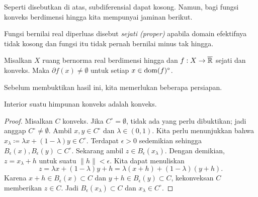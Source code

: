 Seperti disebutkan di atas, subdiferensial dapat kosong. Namun, bagi fungsi konveks berdimensi hingga kita mempunyai jaminan berikut.

Fungsi bernilai real diperluas disebut \emph{sejati (proper)} apabila domain efektifnya tidak kosong dan fungsi itu tidak pernah bernilai minus tak hingga.

\begin{theorem}\label{convexity:thm:nonempty_subgrad}
    Misalkan $X$ ruang bernorma real berdimensi hingga dan $f:X\rightarrow\overline{\mathbb{R}}$ sejati dan konveks. Maka $\partial f(x)\neq \emptyset$ untuk setiap $x\in \operatorname{\mathrm{dom}}(f)^\circ$.
\end{theorem}
Sebelum membuktikan hasil ini, kita memerlukan beberapa persiapan.

\begin{lemma}
    Interior suatu himpunan konveks adalah konveks.
\end{lemma}
\begin{proof}
    Misalkan $C$ konveks. Jika $C^\circ=\emptyset$, tidak ada yang perlu dibuktikan; jadi anggap $C^\circ\neq \emptyset$.
    Ambil $x,y\in C^\circ$ dan $\lambda\in (0,1)$. Kita perlu menunjukkan bahwa $x_\lambda\coloneqq\lambda x + (1-\lambda)y\in C^\circ$.
    Terdapat $\epsilon>0$ sedemikian sehingga $B_\epsilon(x),B_\epsilon(y)\subset C^\circ$. Sekarang ambil $z\in B_{\epsilon}(x_\lambda)$. Dengan demikian, $z=x_\lambda + h$ untuk suatu $\|h\|<\epsilon$. Kita dapat menuliskan
    \begin{equation}
        z = \lambda x + (1-\lambda)y + h = \lambda (x+h) + (1-\lambda)(y + h).
    \end{equation}
    Karena $x+h\in B_\epsilon(x)\subset C$ dan $y+h\in B_\epsilon(y)\subset C$, kekonveksan $C$ memberikan $z\in C$. Jadi $B_\epsilon(x_\lambda)\subset C$ dan $x_\lambda\in C^\circ$.
\end{proof}

